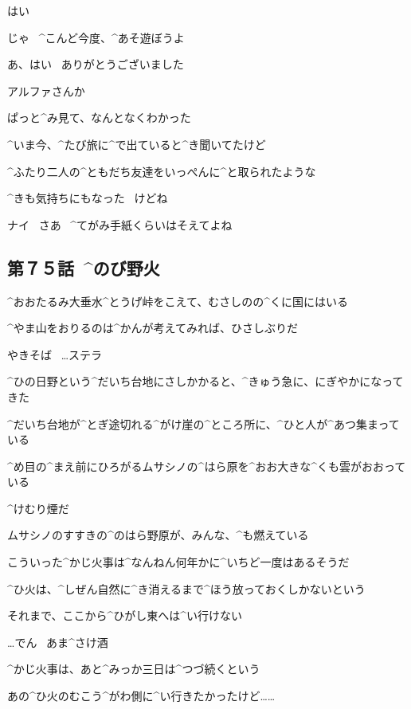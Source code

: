 \Kokone はい

\Maruko じゃ
\ ^{こんど}{今度}、^{あそ}{遊}ぼうよ

\Kokone あ、はい
\ ありがとうございました

\page[130]
\Maruko アルファさんか

\Maruko ぱっと^{み}{見}て、なんとなくわかった

\Maruko ^{いま}{今}、^{たび}{旅}に^{で}{出}ていると^{き}{聞}いてたけど

\page[131]
\Maruko ^{ふたり}{二人}の^{ともだち}{友達}をいっぺんに^{と}{取}られたような

\Maruko ^{きも}{気持}ちにもなった
\ けどね

\page[132]
\Maruko ナイ
\ さあ
\ ^{てがみ}{手紙}くらいはそえてよね


\subsection{第７５話\ ^{のび}{野火}}

\page[134]
\Alpha ^{おおたるみ}{大垂水}^{とうげ}{峠}をこえて、むさしのの^{くに}{国}にはいる

\Alpha ^{やま}{山}をおりるのは^{かんが}{考}えてみれば、ひさしぶりだ

\page[135]
\Sign やきそば
\ …ステラ

\Alpha ^{ひの}{日野}という^{だいち}{台地}にさしかかると、^{きゅう}{急}に、にぎやかになってきた

\Alpha ^{だいち}{台地}が^{とぎ}{途切}れる^{がけ}{崖}の^{ところ}{所}に、^{ひと}{人}が^{あつ}{集}まっている

\page[136]
\Alpha ^{め}{目}の^{まえ}{前}にひろがるムサシノの^{はら}{原}を^{おお}{大}きな^{くも}{雲}がおおっている

\page[137]
\Alpha ^{けむり}{煙}だ

\Alpha ムサシノのすすきの^{のはら}{野原}が、みんな、^{も}{燃}えている

\Alpha こういった^{かじ}{火事}は^{なんねん}{何年}かに^{いちど}{一度}はあるそうだ

\Alpha ^{ひ}{火}は、^{しぜん}{自然}に^{き}{消}えるまで^{ほう}{放}っておくしかないという

\Alpha それまで、ここから^{ひがし}{東}へは^{い}{行}けない

\page[139]
\Sign …でん
\ あま^{さけ}{酒}

\Alpha ^{かじ}{火事}は、あと^{みっか}{三日}は^{つづ}{続}くという

\Alpha あの^{ひ}{火}のむこう^{がわ}{側}に^{い}{行}きたかったけど……

